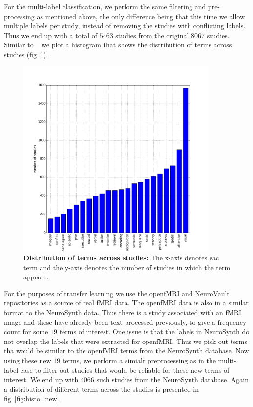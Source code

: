 \documentclass{article} %
\begin{document}
For the multi-label classification, we perform the same filtering and pre-processing as mentioned above, the only difference being that this time we allow multiple labels per study, instead of removing the studies with conflicting labels. Thus we end up with a total of $5463$ studies from the original $8067$ studies. Similar to ~\cite{sanmi2013multi} we plot a histogram that shows the distribution of terms across studies (fig~\ref{fig:histo_old}). 

\begin{figure}[h]
\begin{center}
\includegraphics[height=10cm, width=10cm]{histo_old.png}
\end{center}
\caption{\textbf{Distribution of terms across studies:} The x-axis denotes eac term and the y-axis denotes the number of studies in which the term appears.}
\label{fig:histo_old}
\end{figure}

For the purposes of transfer learning we use the openfMRI and NeuroVault repositories as a source of real fMRI data. The openfMRI data is also in a similar format to the NeuroSynth data.  Thus there is a study associated with an fMRI image and these have already been text-processed previously, to give a frequency count for some $19$ terms of interest.  One issue is that the labels in NeuroSynth do not overlap the labels that were extracted for openfMRI. Thus we pick out terms tha would be similar to the openfMRI terms from the NeuroSynth database. Now using these new $19$ terms, we perform a simialr preprocessing as in the multi-label case to filter out studies that would be reliable for these new terms of interest. We end up with $4066$ such studies from the NeuroSynth database. Again a distribution of different terms across the studies is presented in fig~\ref{fig:histo_new}.
\end{document}
